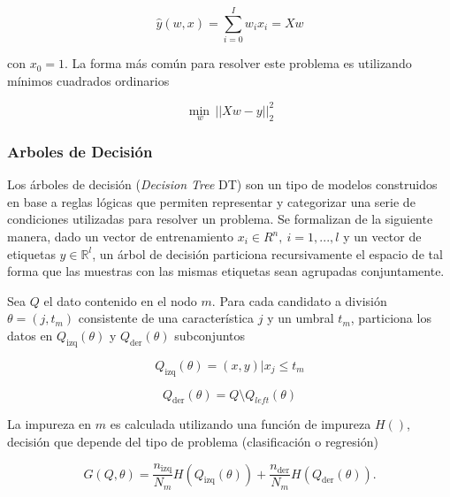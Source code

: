 \documentclass[spanish]{article}
\begin{document}
          \begin{equation}
            \hat{y}(w, x) = \sum_{i=0}^{I} w_i x_i = Xw
          \end{equation}
          
          con $x_0=1$. La forma más común para resolver este problema es utilizando mínimos cuadrados 
          ordinarios
          
          \begin{equation}
            \underset{w}{\min\,} {|| X w - y||_2^2}
          \end{equation}
            
        \subsubsection{Arboles de Decisión}
        
          Los árboles de decisión (\emph{Decision Tree} DT) \cite{breimanolshen} son un tipo de modelos 
          construidos en base 
          a reglas lógicas que permiten representar y categorizar una serie de condiciones utilizadas 
          para resolver un problema. Se formalizan de la siguiente manera, dado un vector de entrenamiento 
          $x_i \in R^n, ~ i=1, ..., l$ y un vector de etiquetas $y \in \mathbb{R}^l$, un árbol de decisión
          particiona recursivamente el espacio de tal forma que las muestras con las mismas etiquetas 
          sean agrupadas conjuntamente. \medskip

          Sea $Q$ el dato contenido en el nodo $m$. Para cada candidato a división $\theta = (j, t_m)$ 
          consistente de una característica $j$ y un umbral $t_m$, particiona los datos en $Q_{\text{izq}}(\theta)$ 
          y $Q_{\text{der}}(\theta)$ subconjuntos
          
          \begin{equation}
            Q_{\text{izq}}(\theta) = (x, y) | x_j \leq t_m
          \end{equation}
          
          \begin{equation}
            Q_{\text{der}}(\theta) = Q \setminus Q_{left}(\theta)
          \end{equation}
          
          
          La impureza en $m$ es calculada utilizando una función de impureza $H()$, decisión que depende 
          del tipo de problema (clasificación o regresión)

          \begin{equation}
            G(Q, \theta) = \frac{n_{\text{izq}}}{N_m} H(Q_{\text{izq}}(\theta)) + \frac{n_{\text{der}}}{N_m} 
              H(Q_{\text{der}}(\theta)).
          \end{equation}            
          
\end{document}
